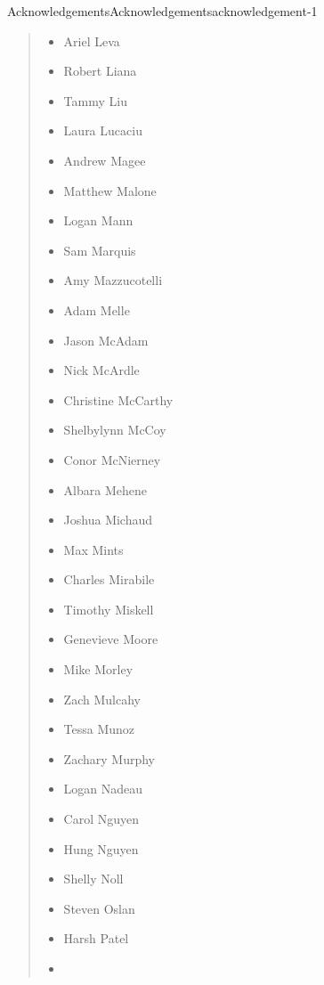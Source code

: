 \documentclass[twoside,10pt,]{book}
\numberwithin{equation}{section}
\begin{document}
\begin{acknowledgement}{Acknowledgements}{}{Acknowledgements}{}{}{acknowledgement-1}
\begin{quote}
\begin{multicols}{2}
\begin{itemize}[label=\textbullet]
\item{}\hypertarget{p-73}{}%
Ariel Leva%
\item{}\hypertarget{p-74}{}%
Robert Liana%
\item{}\hypertarget{p-75}{}%
Tammy Liu%
\item{}\hypertarget{p-76}{}%
Laura Lucaciu%
\item{}\hypertarget{p-77}{}%
Andrew Magee%
\item{}\hypertarget{p-78}{}%
Matthew Malone%
\item{}\hypertarget{p-79}{}%
Logan Mann%
\item{}\hypertarget{p-80}{}%
Sam Marquis%
\item{}\hypertarget{p-81}{}%
Amy Mazzucotelli%
\item{}\hypertarget{p-82}{}%
Adam Melle%
\item{}\hypertarget{p-83}{}%
Jason McAdam%
\item{}\hypertarget{p-84}{}%
Nick McArdle%
\item{}\hypertarget{p-85}{}%
Christine McCarthy%
\item{}\hypertarget{p-86}{}%
Shelbylynn McCoy%
\item{}\hypertarget{p-87}{}%
Conor McNierney%
\item{}\hypertarget{p-88}{}%
Albara Mehene%
\item{}\hypertarget{p-89}{}%
Joshua Michaud%
\item{}\hypertarget{p-90}{}%
Max Mints%
\item{}\hypertarget{p-91}{}%
Charles Mirabile%
\item{}\hypertarget{p-92}{}%
Timothy Miskell%
\item{}\hypertarget{p-93}{}%
Genevieve Moore%
\item{}\hypertarget{p-94}{}%
Mike Morley%
\item{}\hypertarget{p-95}{}%
Zach Mulcahy%
\item{}\hypertarget{p-96}{}%
Tessa Munoz%
\item{}\hypertarget{p-97}{}%
Zachary Murphy%
\item{}\hypertarget{p-98}{}%
Logan Nadeau%
\item{}\hypertarget{p-99}{}%
Carol Nguyen%
\item{}\hypertarget{p-100}{}%
Hung Nguyen%
\item{}\hypertarget{p-101}{}%
Shelly Noll%
\item{}\hypertarget{p-102}{}%
Steven Oslan%
\item{}\hypertarget{p-103}{}%
Harsh Patel%
\item{}\hypertarget{p-104}{}%

\end{itemize}
\end{multicols}
\end{quote}
\end{acknowledgement}
\end{document}
